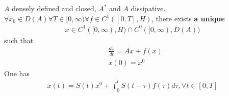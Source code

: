  
 \begin{theorem}
	$A$ densely defined and closed, $A^*$ and $A$ dissipative. $\forall x_0 \in D(A) \forall T \in [0, \infty) \forall f \in C^1([0, T], H)$, there exists \textbf{a unique} 
	\begin{align*}
		x \in C^1([0, \infty), H) \cap C^0([0, \infty), D(A))
	\end{align*}
	such that
	\begin{align*}
		&\frac{dx}{dt} = Ax + f(x) \\
		&x(0) = x^0
	\end{align*}
	One has
	\begin{align*}
		x(t) = S(t) x^0 + \int_0^t S(t - \tau) f(\tau) d\tau , \forall t \in [0, T]
	\end{align*}
\end{theorem}
